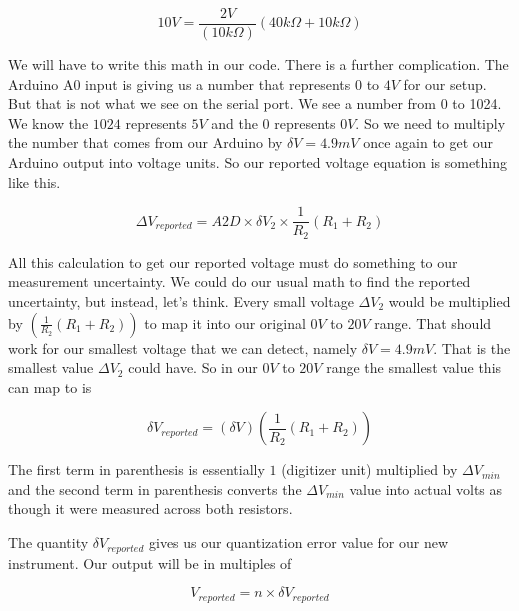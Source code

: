 \begin{equation*}
	10\unit{V}=\frac{2\unit{V}}{\left( 10\unit{k\Omega}\right) }\left( 40\unit{k\Omega}+10\unit{k\Omega}\right)
\end{equation*}

We will have to write this math in our code. There is a further complication. The Arduino A0 input is giving us a number that represents $0$ to $4\unit{V}$ for our setup. But that is not what we see on the serial port. We see a number from 0 to 1024. We know the $1024$ represents $5\unit{V}$ and the $0$ represents $0\unit{V}.$ So we need to multiply the number that comes from our Arduino by $\delta V=4.9\unit{mV}$ once again to get our Arduino output into voltage units. So our reported voltage equation is something like this. 

\begin{equation*}
	\Delta V_{reported}=A2D\times \delta V_{2}\times \frac{1}{R_{2}}\left(R_{1}+R_{2}\right)
\end{equation*}

All this calculation to get our reported voltage must do something to our measurement uncertainty. We could do our usual math to find the reported uncertainty, but instead, let's think. Every small voltage $\Delta V_{2}$ would be multiplied by $\left( \frac{1}{R_{2}}\left( R_{1}+R_{2}\right) \right) $ to map it into our original $0\unit{V}$ to $20\unit{V}$ range. That should work for our smallest voltage that we can detect, namely $\delta V=4.9\unit{mV}.$ That is the smallest value $\Delta V_{2}$ could have. So in our $0\unit{V}$ to $20\unit{V}$ range the smallest value this can map to is  

\begin{equation*}
	\delta V_{reported}=\left( \delta V\right) \left( \frac{1}{R_{2}}\left(R_{1}+R_{2}\right) \right)
\end{equation*}

The first term in parenthesis is essentially $1$ (digitizer unit) multiplied by $\Delta V_{min}$ and the second term in parenthesis converts the $\Delta V_{min}$ value into actual volts as though it were measured across both resistors.

The quantity $\delta V_{reported}$ gives us our quantization error value for our new instrument. Our output will be in multiples of 

\begin{equation*}
	V_{reported}=n\times \delta V_{reported}
\end{equation*}

